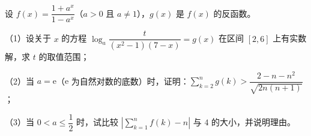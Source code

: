 \begin{question}
设 $f(x)=\dfrac{1+a^x}{1-a^x}$（$a>0$ 且 $a\neq1$），$g(x)$ 是 $f(x)$ 的反函数。

（1）设关于 $x$ 的方程 $\log_a\dfrac{t}{(x^2-1)(7-x)}=g(x)$ 在区间 $[2,6]$ 上有实数解，求 $t$ 的取值范围；

（2）当 $a=\mathrm e$（$\mathrm e$ 为自然对数的底数）时，证明：$\sum\limits_{k=2}^ng(k)>\dfrac{2-n-n^2}{\sqrt{2n(n+1)}}$；

（3）当 $0<a\leqslant\dfrac{1}{2}$ 时，试比较 $\left|\sum\limits_{k=1}^nf(k)-n\right|$ 与 $4$ 的大小，并说明理由。

\end{question}